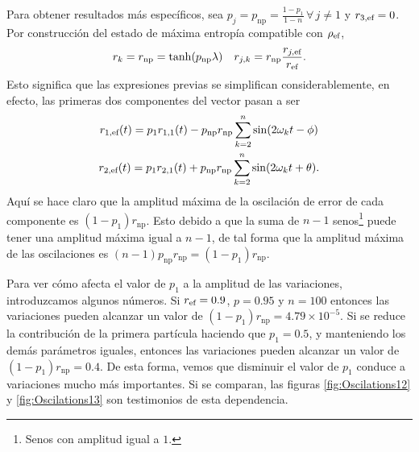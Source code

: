 Para obtener resultados más específicos, sea $p_{j}=p_{\text{np}}=\frac{1-p_{1}}{1-n}\,\forall\,j\neq 1$ y $r_{3,\text{ef}}=0$. Por construcción del estado de máxima entropía compatible con $\rho_{\text{ef}}$,
\begin{align}
    r_{k}=r_{\text{np}}=\tanh(p_{\text{np}} \lambda) & & r_{j,k}=r_{\text{np}}\frac{r_{j,\text{ef}}}{r_{\text{ef}}}.\nonumber
\end{align}
Esto significa que las expresiones previas se simplifican considerablemente, en efecto, las primeras dos componentes del vector pasan a ser
\begin{equation}\label{eq:}
    \begin{gathered}
        r_{1,\text{ef}}(t)=p_{1}r_{1,1}(t)-p_{\text{np}}r_{\text{np}}\sum_{k=2}^{n}\sin(2\omega_{k} t-\phi)\\
        r_{2,\text{ef}}(t)=p_{1}r_{2,1}(t)+p_{\text{np}}r_{\text{np}}\sum_{k=2}^{n}\sin(2\omega_{k} t+\theta).
    \end{gathered}
\end{equation}
Aquí se hace claro que la amplitud máxima de la oscilación de error de cada componente es $(1-p_{1})r_{\text{np}}$. Esto debido a que la suma de $n-1$ senos\footnote{Senos con amplitud igual a $1$.} puede tener una amplitud máxima igual a $n-1$, de tal forma que la amplitud máxima de las oscilaciones es $(n-1)p_{\text{np}}r_{\text{np}}=(1-p_{1})r_{\text{np}}$.


Para ver cómo afecta el valor de $p_{1}$ a la amplitud de las variaciones, introduzcamos algunos números. Si $r_{\text{ef}}=0.9$, $p=0.95$ y $n=100$ entonces las variaciones pueden alcanzar un valor de $(1-p_{1})r_{\text{np}}=4.79\times 10^{-5}$. Si se reduce la contribución de la primera partícula haciendo que $p_{1}=0.5$, y manteniendo los demás parámetros iguales, entonces las variaciones pueden alcanzar un valor de $(1-p_{1})r_{\text{np}}=0.4$. De esta forma, vemos que disminuir el valor de $p_{1}$ conduce a variaciones mucho más importantes. Si se comparan, las figuras \ref{fig:Oscilations12} y \ref{fig:Oscilations13} son testimonios de esta dependencia. 

